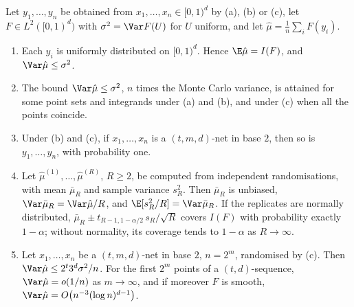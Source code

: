 \begin{proposition}\label{prop:qmc-rqmc}
Let $y_1,\dots,y_n$ be obtained from $x_1,\dots,x_n\in[0,1)^d$ by (a), (b) or (c), let $F\in
L^2([0,1)^d)$ with $\sigma^2=\Var F(U)$ for $U$ uniform, and let $\hat\mu=\frac1n\sum_iF(y_i)$.
\begin{enumerate}[label=(\roman*)]
  \item Each $y_i$ is uniformly distributed on $[0,1)^d$. Hence $\E\hat\mu=I(F)$, and
    $\Var\hat\mu\le\sigma^2$.
  \item The bound $\Var\hat\mu\le\sigma^2$, $n$ times the Monte Carlo variance, is attained for
    some point sets and integrands under (a) and (b), and under (c) when all the points coincide.
  \item Under (b) and (c), if $x_1,\dots,x_n$ is a $(t,m,d)$-net in base $2$, then so is
    $y_1,\dots,y_n$, with probability one.
  \item Let $\hat\mu^{(1)},\dots,\hat\mu^{(R)}$, $R\ge2$, be computed from independent
    randomisations, with mean $\bar\mu_R$ and sample variance $s_R^2$. Then $\bar\mu_R$ is
    unbiased, $\Var\bar\mu_R=\Var\hat\mu/R$, and $\E[s_R^2/R]=\Var\bar\mu_R$. If the replicates
    are normally distributed, $\bar\mu_R\pm t_{R-1,1-\alpha/2}\,s_R/\sqrt R$ covers $I(F)$ with
    probability exactly $1-\alpha$; without normality, its coverage tends to $1-\alpha$ as
    $R\to\infty$.
  \item Let $x_1,\dots,x_n$ be a $(t,m,d)$-net in base $2$, $n=2^m$, randomised by (c). Then
    $\Var\hat\mu\le2^t3^d\sigma^2/n$. For the first $2^m$ points of a $(t,d)$-sequence,
    $\Var\hat\mu=o(1/n)$ as $m\to\infty$, and if moreover $F$ is smooth,
    $\Var\hat\mu=O\big(n^{-3}(\log n)^{d-1}\big)$.
\end{enumerate}
\end{proposition}

